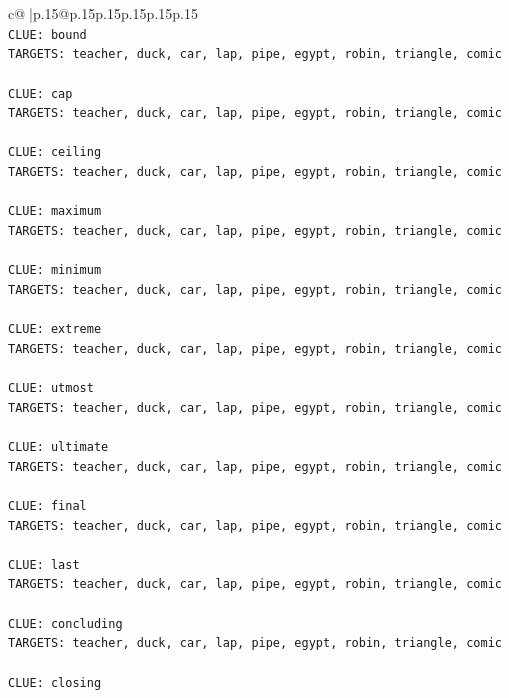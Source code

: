 \documentclass{article}
\begin{document}
{\begin{supertabular}{c@{$\;$}|p{.15\linewidth}@{}p{.15\linewidth}p{.15\linewidth}p{.15\linewidth}p{.15\linewidth}p{.15\linewidth}}
{{{\\ 
\texttt{CLUE: bound} \\
\texttt{TARGETS: teacher, duck, car, lap, pipe, egypt, robin, triangle, comic} \\
\\ 
\texttt{CLUE: cap} \\
\texttt{TARGETS: teacher, duck, car, lap, pipe, egypt, robin, triangle, comic} \\
\\ 
\texttt{CLUE: ceiling} \\
\texttt{TARGETS: teacher, duck, car, lap, pipe, egypt, robin, triangle, comic} \\
\\ 
\texttt{CLUE: maximum} \\
\texttt{TARGETS: teacher, duck, car, lap, pipe, egypt, robin, triangle, comic} \\
\\ 
\texttt{CLUE: minimum} \\
\texttt{TARGETS: teacher, duck, car, lap, pipe, egypt, robin, triangle, comic} \\
\\ 
\texttt{CLUE: extreme} \\
\texttt{TARGETS: teacher, duck, car, lap, pipe, egypt, robin, triangle, comic} \\
\\ 
\texttt{CLUE: utmost} \\
\texttt{TARGETS: teacher, duck, car, lap, pipe, egypt, robin, triangle, comic} \\
\\ 
\texttt{CLUE: ultimate} \\
\texttt{TARGETS: teacher, duck, car, lap, pipe, egypt, robin, triangle, comic} \\
\\ 
\texttt{CLUE: final} \\
\texttt{TARGETS: teacher, duck, car, lap, pipe, egypt, robin, triangle, comic} \\
\\ 
\texttt{CLUE: last} \\
\texttt{TARGETS: teacher, duck, car, lap, pipe, egypt, robin, triangle, comic} \\
\\ 
\texttt{CLUE: concluding} \\
\texttt{TARGETS: teacher, duck, car, lap, pipe, egypt, robin, triangle, comic} \\
\\ 
\texttt{CLUE: closing} \\
}}}
\end{supertabular}}
\end{document}
